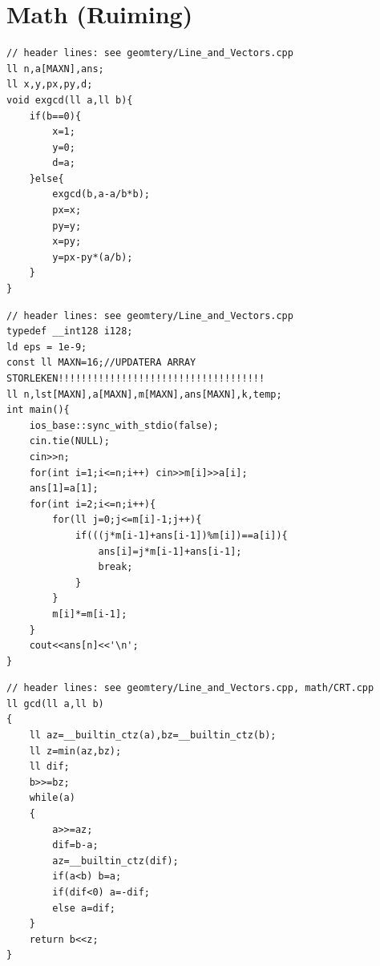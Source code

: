 \section{Math (Ruiming)}


\begin{lstlisting}[breaklines=true]
// header lines: see geomtery/Line_and_Vectors.cpp
ll n,a[MAXN],ans;
ll x,y,px,py,d;
void exgcd(ll a,ll b){
    if(b==0){
        x=1;
        y=0;
        d=a;    
    }else{
        exgcd(b,a-a/b*b);
        px=x;
        py=y;
        x=py;
        y=px-py*(a/b);
    }
}
\end{lstlisting}


\begin{lstlisting}[breaklines=true]
// header lines: see geomtery/Line_and_Vectors.cpp
typedef __int128 i128;
ld eps = 1e-9;
const ll MAXN=16;//UPDATERA ARRAY STORLEKEN!!!!!!!!!!!!!!!!!!!!!!!!!!!!!!!!!!!!
ll n,lst[MAXN],a[MAXN],m[MAXN],ans[MAXN],k,temp;
int main(){
    ios_base::sync_with_stdio(false);
    cin.tie(NULL);
    cin>>n;
    for(int i=1;i<=n;i++) cin>>m[i]>>a[i];
    ans[1]=a[1];
    for(int i=2;i<=n;i++){
        for(ll j=0;j<=m[i]-1;j++){
            if(((j*m[i-1]+ans[i-1])%m[i])==a[i]){
                ans[i]=j*m[i-1]+ans[i-1];
                break;
            }            
        }
        m[i]*=m[i-1];
    }
    cout<<ans[n]<<'\n';
}
\end{lstlisting}


\begin{lstlisting}[breaklines=true]
// header lines: see geomtery/Line_and_Vectors.cpp, math/CRT.cpp
ll gcd(ll a,ll b)
{
	ll az=__builtin_ctz(a),bz=__builtin_ctz(b);
	ll z=min(az,bz);
	ll dif;
	b>>=bz;
	while(a)
	{
		a>>=az;
		dif=b-a;
		az=__builtin_ctz(dif);
		if(a<b) b=a;
		if(dif<0) a=-dif;
		else a=dif;
	}
	return b<<z;
}
\end{lstlisting}

